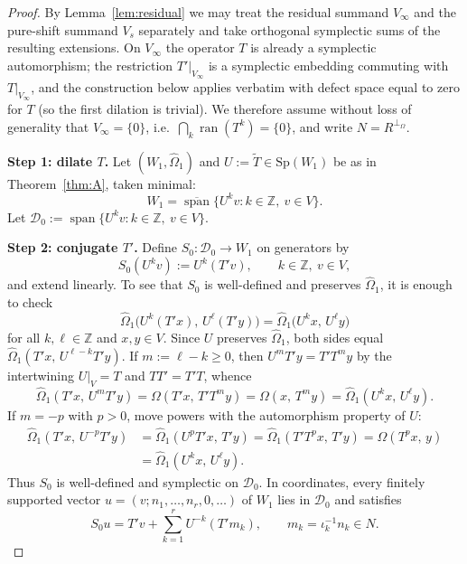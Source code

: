 \documentclass[11pt,a4paper]{article}
\theoremstyle{definition}
\newcommand{\Z}{\mathbb{Z}}
\begin{document}
\begin{proof}
By Lemma~\ref{lem:residual} we may treat the residual summand \(V_\infty\) and the pure-shift
summand \(V_s\) separately and take orthogonal symplectic sums of the resulting extensions. On
\(V_\infty\) the operator \(T\) is already a symplectic automorphism; the restriction \(T'|_{V_\infty}\)
is a symplectic embedding commuting with \(T|_{V_\infty}\), and the construction below applies
verbatim with defect space equal to zero for \(T\) (so the first dilation is trivial). We therefore
assume without loss of generality that \(V_\infty=\{0\}\), i.e.\ \(\bigcap_k\operatorname{ran}(T^k)=\{0\}\),
and write \(N=R^{\perp_\Omega}\).

\medskip
\noindent\textbf{Step 1: dilate \(T\).}
Let \((W_1,\widehat{\Omega}_1)\) and \(U:=\widetilde{T}\in\mathrm{Sp}(W_1)\) be as in
Theorem~\ref{thm:A}, taken minimal:
\begin{equation}
\label{eq:minimal}
W_1=\overline{\operatorname{span}}\{U^k v:k\in\Z,\ v\in V\}.
\end{equation}
Let \(\mathcal{D}_0:=\operatorname{span}\{U^k v:k\in\Z,\ v\in V\}\).

\medskip
\noindent\textbf{Step 2: conjugate \(T'\).}
Define \(S_0:\mathcal{D}_0\to W_1\) on generators by
\begin{equation}
\label{eq:S0}
S_0(U^k v):=U^k(T'v),
\qquad k\in\Z,\ v\in V,
\end{equation}
and extend linearly. To see that \(S_0\) is well-defined and preserves \(\widehat{\Omega}_1\), it is
enough to check
\[
\widehat{\Omega}_1\bigl(U^k(T'x),\,U^\ell(T'y)\bigr)
=\widehat{\Omega}_1\bigl(U^k x,\,U^\ell y\bigr)
\]
for all \(k,\ell\in\Z\) and \(x,y\in V\). Since \(U\) preserves \(\widehat{\Omega}_1\), both sides
equal \(\widehat{\Omega}_1(T'x,\,U^{\ell-k}T'y)\). If \(m:=\ell-k\ge 0\), then
\(U^mT'y=T'T^my\) by the intertwining \(U|_V=T\) and \(TT'=T'T\), whence
\[
\widehat{\Omega}_1(T'x,\,U^mT'y)
=\Omega(T'x,\,T'T^my)
=\Omega(x,\,T^my)
=\widehat{\Omega}_1(U^k x,\,U^\ell y).
\]
If \(m=-p\) with \(p>0\), move powers with the automorphism property of \(U\):
\begin{align*}
\widehat{\Omega}_1(T'x,\,U^{-p}T'y)
&=\widehat{\Omega}_1(U^pT'x,\,T'y)
=\widehat{\Omega}_1(T'T^px,\,T'y)
=\Omega(T^px,\,y)\\
&=\widehat{\Omega}_1(U^k x,\,U^\ell y).
\end{align*}
Thus \(S_0\) is well-defined and symplectic on \(\mathcal{D}_0\). In coordinates,
every finitely supported vector \(u=(v;n_1,\dots,n_r,0,\dots)\) of \(W_1\) lies in \(\mathcal{D}_0\)
and satisfies
\[
S_0u=T'v+\sum_{k=1}^r U^{-k}(T'm_k),
\qquad m_k=\iota_k^{-1}n_k\in N.
\]


\end{proof}
\end{document}
